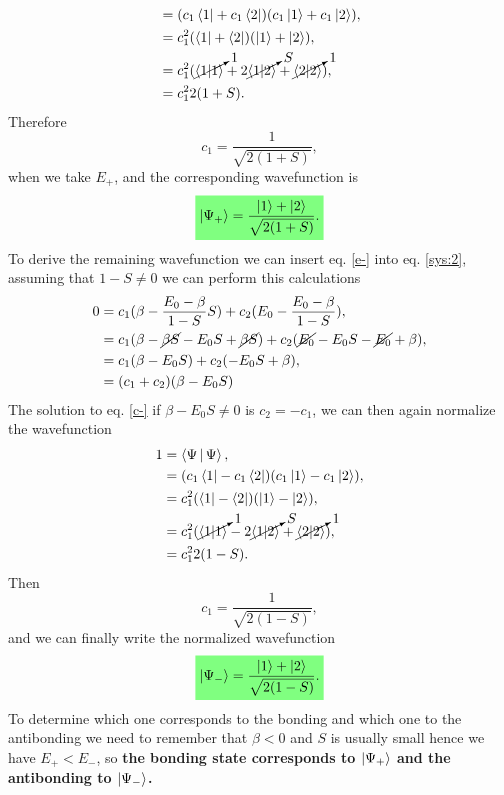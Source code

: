 \begin{questions}
\begin{solution}
\begin{equation}
\begin{aligned}[b]
      &= (c_1\bra{1} + c_1\bra{2})(c_1\ket{1}+ c_1\ket{2}),\\
      &= c_1^2 (\bra{1} + \bra{2})(\ket{1}+ \ket{2}),\\
      &= c_1^2( \cancelto{1}{\braket{1|1}} +2\cancelto{S}{\braket{1|2}} + \cancelto{1}{\braket{2|2}}),\\
      &= c_1^22(1+S).
  \end{aligned}
\end{equation}
Therefore
\begin{equation}
  c_1 = \frac{1}{\sqrt{2(1+S)}},
\end{equation}
when we take $E_+$, and the corresponding wavefunction is
\begin{equation}
  \hlgreen{\ket{\Psi_+} = \frac{\ket{1} + \ket{2}}{\sqrt{2(1+S)}}.}
\end{equation}
To derive the remaining wavefunction we can insert eq. \ref{e-} into eq. \ref{sys:2}, assuming that $1-S \neq 0$ we can perform this calculations
\begin{equation}
  \begin{aligned}[b]
    0 &= c_1(\beta - \frac{E_0-\beta}{1-S}S) + c_2(E_0 - \frac{E_0-\beta}{1-S}),\\
    &= c_1(\beta - \cancel{\beta S} - E_0S+\cancel{\beta S}) + c_2(\cancel{E_0} - E_0S - \cancel{E_0}+\beta),\\
    &= c_1(\beta - E_0S) + c_2( - E_0S+\beta),\\
    &= (c_1 + c_2)(\beta - E_0S)\label{c-}
  \end{aligned}
\end{equation}
The solution to eq. \ref{c-} if $\beta -E_0S \neq 0$ is $c_2 = -c_1$, we can then again normalize the wavefunction
\begin{equation}
  \begin{aligned}[b]
    1 &= \Braket{\Psi|\Psi},\\
      &= (c_1\bra{1} - c_1\bra{2})(c_1\ket{1}- c_1\ket{2}),\\
      &= c_1^2 (\bra{1} - \bra{2})(\ket{1}- \ket{2}),\\
      &= c_1^2( \cancelto{1}{\braket{1|1}} -2\cancelto{S}{\braket{1|2}} + \cancelto{1}{\braket{2|2}}),\\
      &= c_1^22(1-S).
  \end{aligned}
\end{equation}
Then
\begin{equation}
  c_1 = \frac{1}{\sqrt{2(1-S)}},
\end{equation}
and we can finally write the normalized wavefunction
\begin{equation}
  \hlgreen{\ket{\Psi_-} = \frac{\ket{1} + \ket{2}}{\sqrt{2(1-S)}}.}
\end{equation}
To determine which one corresponds to the bonding and which one to the antibonding we need to remember that $\beta<0$ and $S$ is usually small hence we have $E_+<E_-$, so \textbf{the bonding state corresponds to $\ket{\Psi_+}$ and the antibonding to $\ket{\Psi_-}$.}


\end{solution}
\end{questions}
